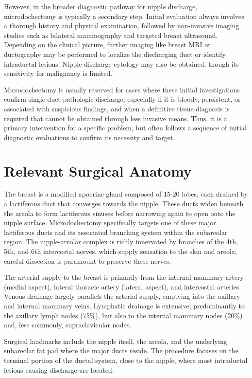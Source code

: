 However, in the broader diagnostic pathway for nipple discharge, microdochectomy is typically a secondary step. Initial evaluation always involves a thorough history and physical examination, followed by non-invasive imaging studies such as bilateral mammography and targeted breast ultrasound. Depending on the clinical picture, further imaging like breast MRI or ductography may be performed to localize the discharging duct or identify intraductal lesions. Nipple discharge cytology may also be obtained, though its sensitivity for malignancy is limited. 

Microdochectomy is usually reserved for cases where these initial investigations confirm single-duct pathologic discharge, especially if it is bloody, persistent, or associated with suspicious findings, and when a definitive tissue diagnosis is required that cannot be obtained through less invasive means. Thus, it is a primary intervention for a specific problem, but often follows a sequence of initial diagnostic evaluations to confirm its necessity and target.

\section*{Relevant Surgical Anatomy}
The breast is a modified apocrine gland composed of 15-20 lobes, each drained by a lactiferous duct that converges towards the nipple. These ducts widen beneath the areola to form lactiferous sinuses before narrowing again to open onto the nipple surface. Microdochectomy specifically targets one of these major lactiferous ducts and its associated branching system within the subareolar region. The nipple-areolar complex is richly innervated by branches of the 4th, 5th, and 6th intercostal nerves, which supply sensation to the skin and areola; careful dissection is paramount to preserve these nerves. 

The arterial supply to the breast is primarily from the internal mammary artery (medial aspect), lateral thoracic artery (lateral aspect), and intercostal arteries. Venous drainage largely parallels the arterial supply, emptying into the axillary and internal mammary veins. Lymphatic drainage is extensive, predominantly to the axillary lymph nodes (75\%), but also to the internal mammary nodes (20\%) and, less commonly, supraclavicular nodes. 

Surgical landmarks include the nipple itself, the areola, and the underlying subareolar fat pad where the major ducts reside. The procedure focuses on the terminal portion of the ductal system, close to the nipple, where most intraductal lesions causing discharge are located. 

